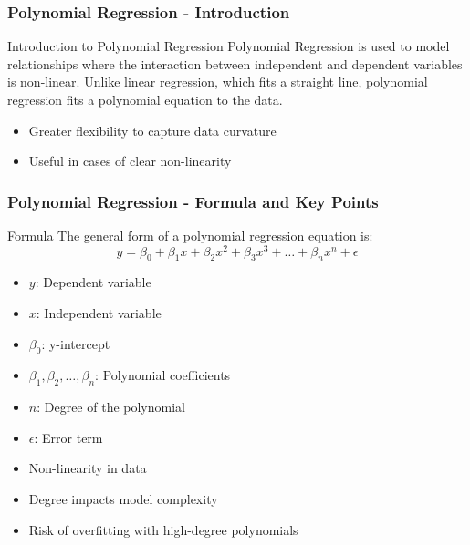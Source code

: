 \documentclass[aspectratio=169]{beamer}
\begin{document}
\begin{frame}[fragile]
    \frametitle{Polynomial Regression - Introduction}
    \begin{block}{Introduction to Polynomial Regression}
        Polynomial Regression is used to model relationships where the interaction between independent and dependent variables is non-linear. 
        Unlike linear regression, which fits a straight line, polynomial regression fits a polynomial equation to the data.
    \end{block}
    
    \begin{itemize}
        \item Greater flexibility to capture data curvature
        \item Useful in cases of clear non-linearity
    \end{itemize}
\end{frame}

\begin{frame}[fragile]
    \frametitle{Polynomial Regression - Formula and Key Points}
    \begin{block}{Formula}
        The general form of a polynomial regression equation is:
        \begin{equation}
            y = \beta_0 + \beta_1 x + \beta_2 x^2 + \beta_3 x^3 + \ldots + \beta_n x^n + \epsilon
        \end{equation}
        \begin{itemize}
            \item $y$: Dependent variable
            \item $x$: Independent variable
            \item $\beta_0$: y-intercept
            \item $\beta_1, \beta_2, \ldots, \beta_n$: Polynomial coefficients
            \item $n$: Degree of the polynomial
            \item $\epsilon$: Error term
        \end{itemize}
    \end{block}

    \begin{itemize}
        \item Non-linearity in data
        \item Degree impacts model complexity
        \item Risk of overfitting with high-degree polynomials
    \end{itemize}
\end{frame}
\end{document}
